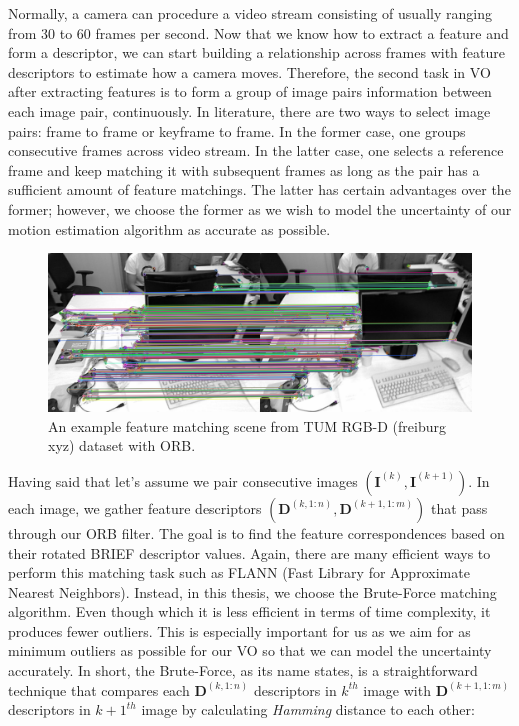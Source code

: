 \documentclass[a4paper]{report}
\numberwithin{figure}{section}
\begin{document}
Normally, a camera can procedure a video stream consisting of 
usually ranging from 30 to 60 frames per second. 
Now that we know how to extract a feature and form a descriptor, 
we can start building a relationship across frames with feature descriptors to 
estimate how a camera 
moves. 
Therefore, the second task in VO after 
extracting features is to form a group of image pairs information between each 
image pair, continuously. In literature, there are two ways to select image 
pairs: frame to frame or keyframe to frame. In the former case, one groups 
consecutive frames across video stream. In the latter case, one selects a 
reference frame and keep matching it with subsequent frames as long as the 
pair has a sufficient amount of feature matchings. The latter has certain 
advantages over the former; however, we choose the former as we wish to model 
the uncertainty of our motion estimation algorithm as accurate as possible. 

\begin{figure}[H]
	\centering
	\includegraphics[width=\linewidth,natwidth=640,natheight=640]
	{fig/ref_imgs/covo_matches.png}
	\caption[ORB Feature Mathces]
	{An example feature matching scene from 
	TUM RGB-D (freiburg xyz) dataset with ORB.}
	\label{fig:feature_matchings}
\end{figure}

Having said that let's assume we pair consecutive images $(\mathbf{I}^{(k)}, 
\mathbf{I}^{(k+1)})$. In each image, we gather feature descriptors 
$(\mathbf{D}^{(k,1:n)}, \mathbf{D}^{(k+1,1:m)})$ that pass through our ORB 
filter. The goal is to find the feature correspondences based on their rotated 
BRIEF descriptor values. Again, there are many efficient ways to perform this 
matching task such as FLANN (Fast Library for Approximate Nearest Neighbors). 
Instead, in this thesis, we choose the Brute-Force matching algorithm.
Even though which it is less efficient in terms of time complexity, it 
produces fewer outliers. This is especially important for us as we aim for as 
minimum outliers as possible for our VO so that we can model the uncertainty 
accurately. 
In short, the Brute-Force, as its name states, is a straightforward technique 
that 
compares each $\mathbf{D}^{(k,1:n)}$ descriptors in $k^{th}$ image with 
$\mathbf{D}^{(k+1,1:m)}$ descriptors in $k+1^{th}$ image by calculating 
\textit{Hamming} distance to each other:
\end{document}
